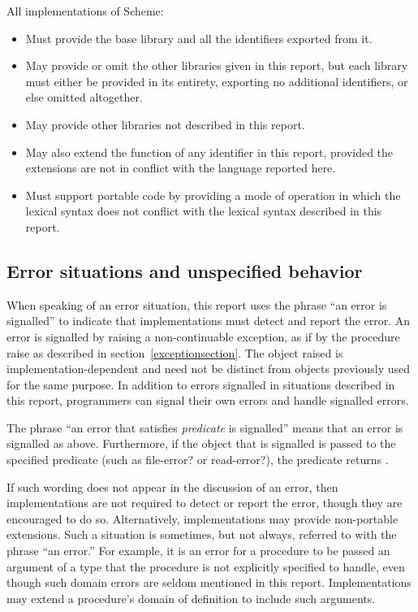 All implementations of Scheme:
\begin{itemize}

\item Must provide the base library and all the identifiers
exported from it.

\item May provide or omit the other
libraries given in this report, but each library must either be provided
in its entirety, exporting no additional identifiers, or else omitted
altogether.

\item May provide other libraries not described in this report.

\item May also extend the function of any identifier in this
report, provided the extensions are not in conflict with the language
reported here.

\item Must support portable
code by providing a mode of operation in which the lexical syntax does
not conflict with the lexical syntax described in this report.
\end{itemize}

\subsection{Error situations and unspecified behavior}
\label{errorsituations}

When speaking of an error situation, this report uses the phrase ``an
error is signalled'' to indicate that implementations must detect and
report the error.
An error is signalled by raising a non-continuable exception, as if by
the procedure {\cf raise} as described in section~\ref{exceptionsection}.  The object raised is implementation-dependent
and need not be distinct from objects previously used for the same purpose.
In addition to errors signalled in situations described in this
report, programmers can signal their own errors and handle signalled errors.

The phrase ``an error that satisfies {\em predicate} is signalled'' means that an error is
signalled as above.  Furthermore, if the object that is signalled is
passed to the specified predicate (such as {\cf file-error?} or {\cf
read-error?}), the predicate returns \schtrue{}.

\vest If such wording does not appear in the discussion of
an error, then implementations are not required to detect or report the
error, though they are encouraged to do so.
Alternatively, implementations may provide non-portable extensions.
Such a situation is sometimes, but not always, referred to with the phrase
``an error.''
For example, it is an error for a procedure to be passed an argument of a type that
the procedure is not explicitly specified to handle, even though such
domain errors are seldom mentioned in this report.  Implementations may
extend a procedure's domain of definition to include such arguments.


